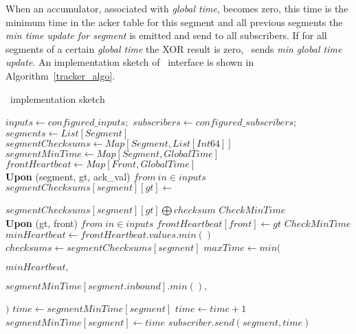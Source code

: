When an accumulator, associated with \textit{global time}, becomes zero, this time is the minimum time in the acker table for this segment and all previous segments the \textit{min time update for segment} is emitted and send to all subscribers. If for all segments of a certain \textit{global time} the XOR result is zero, \tracker\ sends \textit{min global time update}. An implementation sketch of \tracker\ interface is shown in Algorithm~\ref{tracker_algo}.

\begin{algorithm}
\caption{\tracker\ implementation sketch}
\label{tracker_algo}
\begin{algorithmic}[1]
\State $inputs \leftarrow configured\_inputs;$ 
\State $subscribers \leftarrow configured\_subscribers;$
\State $segments \leftarrow List[Segment]$
\State $segmentChecksums \leftarrow Map[Segment, List[Int64]]$
\State $segmentMinTime \leftarrow Map[Segment, GlobalTime]$
\State $frontHeartbeat \leftarrow Map[Front, GlobalTime]$
\\
\State \textbf{Upon} (segment, gt, ack\_val) $from \ in\in inputs$
\Indent
    \State $segmentChecksums[segment][gt] \gets $
    \par\Indent\Indent$segmentChecksums[segment][gt] \bigoplus checksum$\EndIndent\EndIndent
    \State $CheckMinTime$
\EndIndent
\\
\State \textbf{Upon} (gt, front) $from \ in\in inputs$
\Indent
 \State $frontHeartbeat[front] \leftarrow gt$
 \State $CheckMinTime$
\EndIndent
\\
\State $minHeartbeat \leftarrow frontHeartbeat.values.min()$
\State $checksums \gets segmentChecksums[segment]$
\State $maxTime \gets min($
\par\Indent\Indent$minHeartbeat,$\EndIndent\EndIndent
\par\Indent\Indent$segmentMinTime[segment.inbound].min(),$\EndIndent\EndIndent
\par\Indent$)$\EndIndent
\State $time \gets segmentMinTime[segment]$
\State $time \gets time + 1$
\EndWhile
{}
\State $segmentMinTime[segment] \gets time$
\State $subscriber.send(segment, time)$
\EndFor
\EndIf
\EndFor
\EndProcedure
\end{algorithmic}
\end{algorithm}

